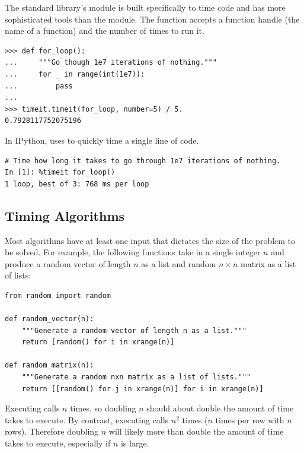 The standard library's  module is built specifically to time code and has more sophisticated tools than the  module.
The  function accepts a function handle (the name of a function) and the number of times to run it.

\begin{lstlisting}
>>> def for_loop():
...     """Go though 1e7 iterations of nothing."""
...     for _ in range(int(1e7)):
...         pass
...
>>> timeit.timeit(for_loop, number=5) / 5.
0.7928117752075196
\end{lstlisting}

In IPython,  uses  to quickly time a single line of code.

\begin{lstlisting}
# Time how long it takes to go through 1e7 iterations of nothing.
In [1]: %timeit for_loop()
1 loop, best of 3: 768 ms per loop
\end{lstlisting}

\subsection*{Timing Algorithms} %

Most algorithms have at least one input that dictates the size of the problem to be solved.
For example, the following functions take in a single integer $n$ and produce a random vector of length $n$ as a list and random $n\times n$ matrix as a list of lists:

\begin{lstlisting}
from random import random

def random_vector(n):
    """Generate a random vector of length n as a list."""
    return [random() for i in xrange(n)]

def random_matrix(n):
    """Generate a random nxn matrix as a list of lists."""
    return [[random() for j in xrange(n)] for i in xrange(n)]
\end{lstlisting}

Executing  calls  $n$ times, so doubling $n$ should about double the amount of time  takes to execute.
By contrast, executing  calls  $n^2$ times ($n$ times per row with $n$ rows).
Therefore doubling $n$ will likely more than double the amount of time  takes to execute, especially if $n$ is large.

